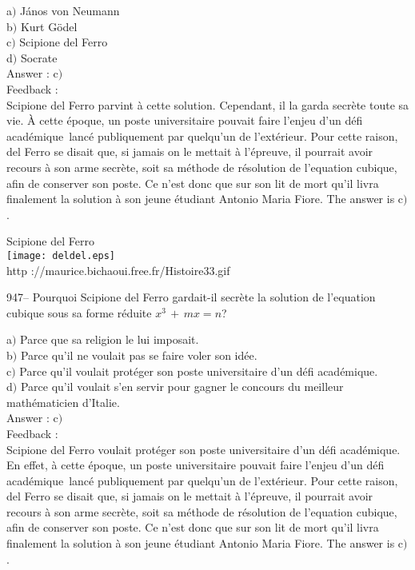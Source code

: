 \documentclass[letterpaper, 12pt]{article}
\begin{document}
a$)$ J\'anos von Neumann\\
b$)$ Kurt G\"odel  \\
c$)$ Scipione del Ferro \\
d$)$ Socrate\\

Answer : c$)$\\

Feedback : \\
Scipione del Ferro parvint \`a cette solution. Cependant, il la
garda secr\`ete toute sa vie. \`A cette \'epoque, un poste
universitaire pouvait faire l'enjeu d'un \og d\'efi acad\'emique\fg\
lanc\'e publiquement par quelqu'un de l'ext\'erieur. Pour cette
raison, del Ferro se disait que, si jamais on le mettait \`a
l'\'epreuve, il pourrait avoir recours \`a son arme secr\`ete, soit
sa m\'ethode de r\'esolution de l'equation cubique, afin de
conserver son poste. Ce n'est donc que sur son lit de mort qu'il
livra finalement la solution \`a son jeune
\'etudiant Antonio Maria Fiore. The answer is c$)$.\\

        \begin{center}
        Scipione del Ferro\\
    \texttt{[image: deldel.eps]}\\
        {\footnotesize http ://maurice.bichaoui.free.fr/Histoire33.gif}
    \end{center}

947-- Pourquoi Scipione del Ferro gardait-il secr\`ete la solution
de l'equation cubique sous sa forme r\'eduite $x^3\,+\,mx=n$?

a$)$ Parce que sa religion le lui imposait. \\
b$)$ Parce qu'il ne voulait pas se faire voler son id\'ee. \\
c$)$ Parce qu'il voulait prot\'eger son poste universitaire d'un \og
d\'efi acad\'emique\fg . \\
d$)$ Parce qu'il voulait s'en servir pour gagner le concours du meilleur
math\'ematicien d'Italie.\\

Answer : c$)$\\

Feedback :\\
Scipione del Ferro voulait prot\'eger son poste universitaire d'un
\og d\'efi acad\'emique\fg . En effet, \`a cette \'epoque, un poste
universitaire pouvait faire l'enjeu d'un \og d\'efi acad\'emique\fg\
lanc\'e publiquement par quelqu'un de l'ext\'erieur. Pour cette
raison, del Ferro se disait que, si jamais on le mettait \`a
l'\'epreuve, il pourrait avoir recours \`a son arme secr\`ete, soit
sa m\'ethode de r\'esolution de l'equation cubique, afin de
conserver son poste. Ce n'est donc que sur son lit de mort qu'il
livra finalement la solution \`a son jeune
\'etudiant Antonio Maria Fiore. The answer is c$)$.\\
\end{document}
